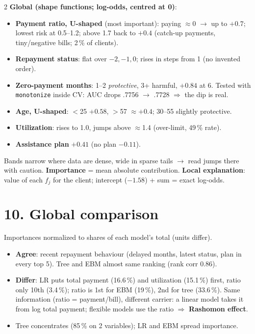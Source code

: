 \documentclass[a4paper,9pt]{extarticle}
\begin{document}
\begin{multicols}{2}
\textbf{Global (shape functions; log-odds, centred at 0)}:
\begin{itemize}
\item \textbf{Payment ratio, U-shaped} (most important): paying $\approx$0 $\to$ up to $+0.7$; lowest risk at
      0.5--1.2; above 1.7 back to $+0.4$ (catch-up payments, tiny/negative bills; 2\,\% of clients).
\item \textbf{Repayment status}: flat over $-2,-1,0$; rises in steps from 1 (no invented order).
\item \textbf{Zero-payment months}: 1--2 \emph{protective}, 3+ harmful, $+0.84$ at 6. Tested with
      \texttt{monotonize} inside CV: AUC drops .7756 $\to$ .7728 $\Rightarrow$ the dip is real.
\item \textbf{Age, U-shaped}: $<$25 $+0.58$, $>$57 $\approx+0.4$; 30--55 slightly protective.
\item \textbf{Utilization}: rises to 1.0, jumps above $\approx$1.4 (over-limit, 49\,\% rate).
\item \textbf{Assistance plan} $+0.41$ (no plan $-0.11$).
\end{itemize}
Bands narrow where data are dense, wide in sparse tails $\to$ read jumps there with caution.
\textbf{Importance} = mean absolute contribution.
\textbf{Local explanation}: value of each $f_j$ for the client; intercept ($-1.58$) + sum = exact log-odds.

\section{10. Global comparison}
Importances normalized to shares of each model's total (units differ).
\begin{itemize}
\item \textbf{Agree}: recent repayment behaviour (delayed months, latest status, plan in every top 5).
      Tree and EBM almost same ranking (rank corr 0.86).
\item \textbf{Differ}: LR puts total payment (16.6\,\%) and utilization (15.1\,\%) first, ratio only 10th
      (3.4\,\%); ratio is 1st for EBM (19\,\%), 2nd for tree (33.6\,\%). Same information (ratio = payment/bill),
      different carrier: a linear model takes it from log total payment; flexible models use the ratio
      $\Rightarrow$ \textbf{Rashomon effect}.
\item Tree concentrates (85\,\% on 2 variables); LR and EBM spread importance.
\end{itemize}


\end{multicols}
\end{document}
